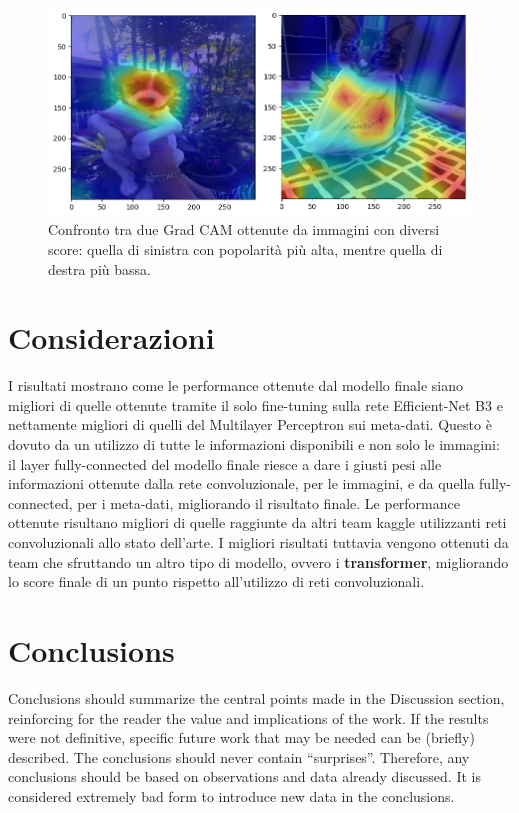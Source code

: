 \vspace{1cm}

\begin{figure}[h]
        \centering
        \includegraphics[scale=0.6]{Plot/GRAD-CAM.png}
        \caption{Confronto tra due Grad CAM ottenute da immagini con diversi score: quella di sinistra con popolarità più alta, mentre quella di destra più bassa.}
        \label{fig:grad-cam}
\end{figure}
    

    
    
\newpage


\section{Considerazioni}

I risultati mostrano come le performance ottenute dal modello finale siano migliori di quelle ottenute tramite il solo fine-tuning sulla rete Efficient-Net B3 e nettamente migliori di quelli del Multilayer Perceptron sui meta-dati. Questo è dovuto da un utilizzo di tutte le informazioni disponibili e non solo le immagini: il layer fully-connected del modello finale riesce a dare i giusti pesi alle informazioni ottenute dalla rete convoluzionale, per le immagini, e da quella fully-connected, per i meta-dati, migliorando il risultato finale. Le performance ottenute risultano migliori di quelle raggiunte da altri team kaggle utilizzanti reti convoluzionali allo stato dell'arte. I migliori risultati tuttavia vengono ottenuti da team che sfruttando un altro tipo di modello, ovvero i \textbf{transformer}, migliorando lo score finale di un punto rispetto all'utilizzo di reti convoluzionali.


\section{Conclusions}
Conclusions should summarize the central points made in the Discussion section, reinforcing for the reader the value and implications of the work. If the results were not definitive, specific future work that may be needed can be (briefly) described. The conclusions should never contain ``surprises''. Therefore, any conclusions should be based on observations and data already discussed. It is considered extremely bad form to introduce new data in the conclusions.

